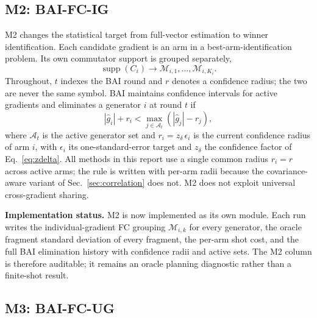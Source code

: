 \documentclass[10pt]{article}
\newcommand{\supp}{\operatorname{supp}}
\begin{document}
\subsection{M2: BAI-FC-IG}

M2 changes the statistical target from full-vector estimation to winner identification. Each candidate gradient is an arm in a best-arm-identification problem. Its own commutator support is grouped separately,
\begin{equation}
  \supp(C_i) \longrightarrow \mathcal M_{i,1},\ldots,\mathcal M_{i,K_i} .
\end{equation}
Throughout, $t$ indexes the BAI round and $r$ denotes a confidence radius; the two are never the same symbol. BAI maintains confidence intervals for active gradients and eliminates a generator $i$ at round $t$ if
\begin{equation}
  |\widehat g_i|+r_i < \max_{j\in\mathcal A_t}\left(|\widehat g_j|-r_j\right),
  \label{eq:bai-elim}
\end{equation}
where $\mathcal A_t$ is the active generator set and $r_i=z_\delta\,\epsilon_i$ is the current confidence radius of arm $i$, with $\epsilon_i$ its one-standard-error target and $z_\delta$ the confidence factor of Eq.~\eqref{eq:zdelta}. All methods in this report use a single common radius $r_i=r$ across active arms; the rule is written with per-arm radii because the covariance-aware variant of Sec.~\ref{sec:correlation} does not. M2 does not exploit universal cross-gradient sharing.

\textbf{Implementation status.} M2 is now implemented as its own module. Each run writes the individual-gradient FC grouping $\mathcal M_{i,k}$ for every generator, the oracle fragment standard deviation of every fragment, the per-arm shot cost, and the full BAI elimination history with confidence radii and active sets. The M2 column is therefore auditable; it remains an oracle planning diagnostic rather than a finite-shot result.

\subsection{M3: BAI-FC-UG}
\end{document}
